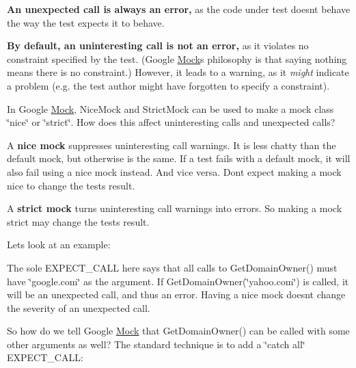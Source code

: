 {\bfseries{An unexpected call is always an error,}} as the code under test doesn\textquotesingle{}t behave the way the test expects it to behave.

{\bfseries{By default, an uninteresting call is not an error,}} as it violates no constraint specified by the test. (Google \mbox{\hyperlink{classMock}{Mock}}\textquotesingle{}s philosophy is that saying nothing means there is no constraint.) However, it leads to a warning, as it {\itshape might} indicate a problem (e.\+g. the test author might have forgotten to specify a constraint).

In Google \mbox{\hyperlink{classMock}{Mock}}, {\ttfamily Nice\+Mock} and {\ttfamily Strict\+Mock} can be used to make a mock class \char`\"{}nice\char`\"{} or \char`\"{}strict\char`\"{}. How does this affect uninteresting calls and unexpected calls?

A {\bfseries{nice mock}} suppresses uninteresting call warnings. It is less chatty than the default mock, but otherwise is the same. If a test fails with a default mock, it will also fail using a nice mock instead. And vice versa. Don\textquotesingle{}t expect making a mock nice to change the test\textquotesingle{}s result.

A {\bfseries{strict mock}} turns uninteresting call warnings into errors. So making a mock strict may change the test\textquotesingle{}s result.

Let\textquotesingle{}s look at an example\+:


\begin{DoxyCode}{0}
\DoxyCodeLine{}
\DoxyCodeLine{\}}
\end{DoxyCode}


The sole {\ttfamily E\+X\+P\+E\+C\+T\+\_\+\+C\+A\+LL} here says that all calls to {\ttfamily Get\+Domain\+Owner()} must have {\ttfamily \char`\"{}google.\+com\char`\"{}} as the argument. If {\ttfamily Get\+Domain\+Owner(\char`\"{}yahoo.\+com\char`\"{})} is called, it will be an unexpected call, and thus an error. Having a nice mock doesn\textquotesingle{}t change the severity of an unexpected call.

So how do we tell Google \mbox{\hyperlink{classMock}{Mock}} that {\ttfamily Get\+Domain\+Owner()} can be called with some other arguments as well? The standard technique is to add a \char`\"{}catch all\char`\"{} {\ttfamily E\+X\+P\+E\+C\+T\+\_\+\+C\+A\+LL}\+:


